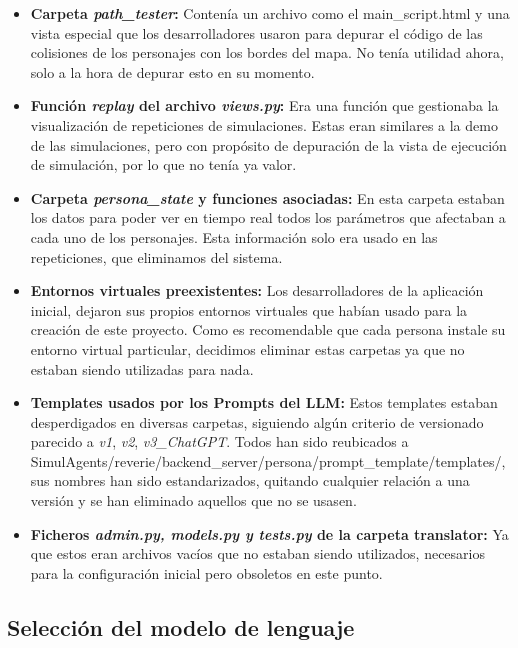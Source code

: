 \begin{itemize}
	\item \textbf{Carpeta \textit{path\_tester}:} Contenía un archivo como el main\_script.html y una vista especial que los desarrolladores usaron para depurar el código de las colisiones de los personajes con los bordes del mapa. No tenía utilidad ahora, solo a la hora de depurar esto en su momento.
 
	\item \textbf{Función \textit{replay} del archivo \textit{views.py}:} Era una función que gestionaba la visualización de repeticiones de simulaciones. Estas eran similares a la demo de las simulaciones, pero con propósito de depuración de la vista de ejecución de simulación, por lo que no tenía ya valor.
	
	\item \textbf{Carpeta \textit{persona\_state} y funciones asociadas:} En esta carpeta estaban los datos para poder ver en tiempo real todos los parámetros que afectaban a cada uno de los personajes. Esta información solo era usado en las repeticiones, que eliminamos del sistema.
	
	\item \textbf{Entornos virtuales preexistentes:} Los desarrolladores de la aplicación inicial, dejaron sus propios entornos virtuales que habían usado para la creación de este proyecto. Como es recomendable que cada persona instale su entorno virtual particular, decidimos eliminar estas carpetas ya que no estaban siendo utilizadas para nada.

    \item \textbf{Templates usados por los Prompts del LLM:} Estos templates estaban desperdigados en diversas carpetas, siguiendo algún criterio de versionado parecido a \textit{v1}, \textit{v2}, \textit{v3\_ChatGPT}. Todos han sido reubicados a SimulAgents/reverie/backend\_server/persona/prompt\_template/templates/, sus nombres han sido estandarizados, quitando cualquier relación a una versión y se han eliminado aquellos que no se usasen.
	
	\item \textbf{Ficheros \textit{admin.py, models.py y tests.py} de la carpeta translator:} Ya que estos eran archivos vacíos que no estaban siendo utilizados,  necesarios para la configuración inicial pero obsoletos en este punto.
	
\end{itemize}

\subsection{Selección del modelo de lenguaje}\label{subsec:Selección del modelo de lenguaje}

